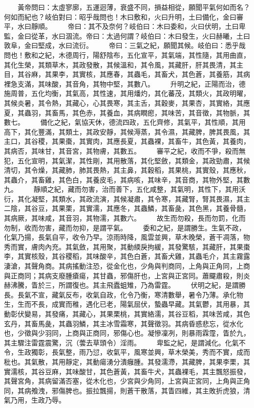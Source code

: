 　　黃帝問曰：太虛寥廓，五運迴薄，衰盛不同，損益相從，願聞平氣何如而名？何如而紀也？岐伯對曰：昭乎哉問也！木曰敷和，火曰升明，土曰備化，金曰審平，水曰靜順。
　　帝曰：其不及奈何？岐伯曰：木曰委和，火曰伏明，土曰卑監，金曰從革，水曰涸流。帝曰：太過何謂？岐伯曰：木曰發生，火曰赫曦，土曰敦阜，金曰堅成，水曰流衍。
　　帝曰：三氣之紀，願聞其候。岐伯曰：悉乎哉問也！敷和之紀，木德周行，陽舒陰布，五化宣平，其氣端，其性隨，其用曲直，其化生榮，其類草木，其政發散，其候溫和，其令風，其藏肝，肝其畏清，其主目，其谷麻，其果李，其實核，其應春，其蟲毛，其畜犬，其色蒼，其養筋，其病裡急支滿，其味酸，其音角，其物中堅，其數八。
　　升明之紀，正陽而治，德施周普，五化均衡，其氣高，其性速，其用燔灼，其化蕃茂，其類火，其政明曜，其候炎暑，其令熱，其藏心，心其畏寒，其主舌，其穀麥，其果杏，其實絡，其應夏，其蟲羽，其畜馬，其色赤，其養血，其病瞤瘛，其味苦，其音徵，其物脈，其數七。
　　備化之紀，氣協天休，德流四政，五化齊修，其氣平，其性順，其用高下，其化豐滿，其類土，其政安靜，其候溽蒸，其令濕，其藏脾，脾其畏風，其主口，其谷稷，其果棗，其實肉，其應長夏，其蟲裸，其畜牛，其色黃，其養肉，其病否，其味甘，其音宮，其物膚，其數五。
　　審平之紀，收而不爭，殺而無犯，五化宣明，其氣潔，其性剛，其用散落，其化堅斂，其類金，其政勁肅，其候清切，其令燥，其藏肺，肺其畏熱，其主鼻，其穀稻，其果桃，其實殼，其應秋，其蟲介，其畜雞，其色白，其養皮毛，其病咳，其味辛，其音商，其物外堅，其數九。
　　靜順之紀，藏而勿害，治而善下，五化咸整，其氣明，其性下，其用沃衍，其化凝堅，其類水，其政流演，其候凝肅，其令寒，其藏腎，腎其畏濕，其主二陰，其谷豆，其果栗，其實濡，其應冬，其蟲鱗，其畜彘，其色黑，其養骨髓，其病厥，其味咸，其音羽，其物濡，其數六。
　　故生而勿殺，長而勿罰，化而勿制，收而勿害，藏而勿抑，是謂平氣。
　　委和之紀，是謂勝生。生氣不政，化氣乃揚，長氣自平，收令乃早。涼雨時降，風雲並興，草木晚榮，蒼干凋落，物秀而實，膚肉內充。其氣斂，其用聚，其動緛戾拘緩，其發驚駭，其藏肝，其果棗李，其實核殼，其谷稷稻，其味酸辛，其色白蒼，其畜犬雞，其蟲毛介，其主霧露淒滄，其聲角商。其病搖動注恐，從金化也，少角與判商同，上角與正角同，上商與正商同；其病支廢腫瘡瘍，其甘蟲，邪傷肝也，上宮與正宮同。蕭飋肅殺，則炎赫沸騰，眚於三，所謂復也。其主飛蠹蛆雉，乃為雷霆。
　　伏明之紀，是謂勝長。長氣不宣，藏氣反布，收氣自政，化令乃衡，寒清數舉，暑令乃薄。承化物生，生而不長，成實而稚，遇化已老，陽氣屈伏，蟄蟲早藏。其氣鬱，其用暴，其動彰伏變易，其發痛，其藏心，其果栗桃，其實絡濡，其谷豆稻，其味苦咸，其色玄丹，其畜馬彘，其蟲羽鱗，其主冰雪霜寒，其聲徵羽。其病昏惑悲忘，從水化也，少徵與少羽同，上商與正商同，邪傷心也。凝慘凜冽，則暴雨霖霪，眚於九，其主驟注雷霆震驚，沉（蕓去草頭令）淫雨。
　　卑監之紀，是謂減化。化氣不令，生政獨彰，長氣整，雨乃愆，收氣平，風寒並興，草木榮美，秀而不實，成而秕也。其氣散，其用靜定，其動瘍湧分潰癰腫。其發濡滯，其藏脾，其果李栗，其實濡核，其谷豆麻，其味酸甘，其色蒼黃，其畜牛犬，其蟲裸毛，其主飄怒振發，其聲宮角，其病留滿否塞，從木化也，少宮與少角同，上宮與正宮同，上角與正角同，其病飧洩，邪傷脾也。振拉飄揚，則蒼干散落，其眚四維，其主敗折虎狼，清氣乃用，生政乃辱。
